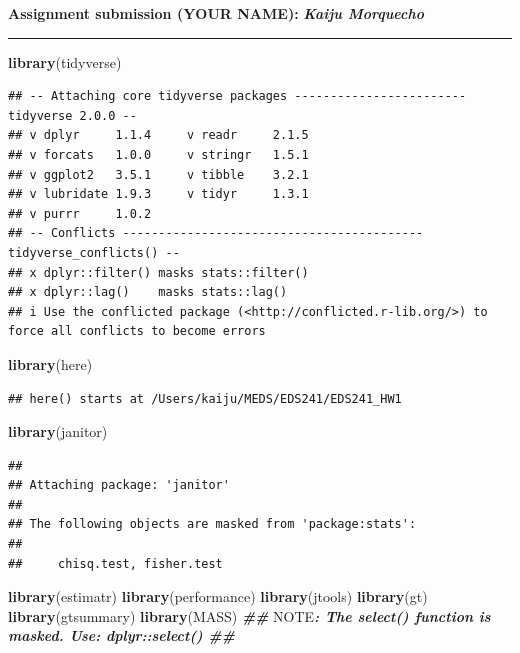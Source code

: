 \documentclass[
]{article}
\newenvironment{Shaded}{\begin{snugshade}}{\end{snugshade}}
\newcommand{\AlertTok}[1]{\textcolor[rgb]{0.94,0.16,0.16}{#1}}
\newcommand{\DocumentationTok}[1]{\textcolor[rgb]{0.56,0.35,0.01}{\textbf{\textit{#1}}}}
\newcommand{\FunctionTok}[1]{\textcolor[rgb]{0.13,0.29,0.53}{\textbf{#1}}}
\newcommand{\NormalTok}[1]{#1}
\begin{document}
\textbf{Assignment submission (YOUR NAME):} \textbf{\emph{Kaiju
Morquecho }}

\begin{center}\rule{0.5\linewidth}{0.5pt}\end{center}

\begin{Shaded}
\begin{Highlighting}[]
\FunctionTok{library}\NormalTok{(tidyverse)}
\end{Highlighting}
\end{Shaded}

\begin{verbatim}
## -- Attaching core tidyverse packages ------------------------ tidyverse 2.0.0 --
## v dplyr     1.1.4     v readr     2.1.5
## v forcats   1.0.0     v stringr   1.5.1
## v ggplot2   3.5.1     v tibble    3.2.1
## v lubridate 1.9.3     v tidyr     1.3.1
## v purrr     1.0.2     
## -- Conflicts ------------------------------------------ tidyverse_conflicts() --
## x dplyr::filter() masks stats::filter()
## x dplyr::lag()    masks stats::lag()
## i Use the conflicted package (<http://conflicted.r-lib.org/>) to force all conflicts to become errors
\end{verbatim}

\begin{Shaded}
\begin{Highlighting}[]
\FunctionTok{library}\NormalTok{(here)}
\end{Highlighting}
\end{Shaded}

\begin{verbatim}
## here() starts at /Users/kaiju/MEDS/EDS241/EDS241_HW1
\end{verbatim}

\begin{Shaded}
\begin{Highlighting}[]
\FunctionTok{library}\NormalTok{(janitor)}
\end{Highlighting}
\end{Shaded}

\begin{verbatim}
## 
## Attaching package: 'janitor'
## 
## The following objects are masked from 'package:stats':
## 
##     chisq.test, fisher.test
\end{verbatim}

\begin{Shaded}
\begin{Highlighting}[]
\FunctionTok{library}\NormalTok{(estimatr)  }
\FunctionTok{library}\NormalTok{(performance)}
\FunctionTok{library}\NormalTok{(jtools)}
\FunctionTok{library}\NormalTok{(gt)}
\FunctionTok{library}\NormalTok{(gtsummary)}
\FunctionTok{library}\NormalTok{(MASS) }\DocumentationTok{\#\# }\AlertTok{NOTE}\DocumentationTok{: The \textasciigrave{}select()\textasciigrave{} function is masked. Use: \textasciigrave{}dplyr::select()\textasciigrave{} \#\#}
\end{Highlighting}
\end{Shaded}
\end{document}
